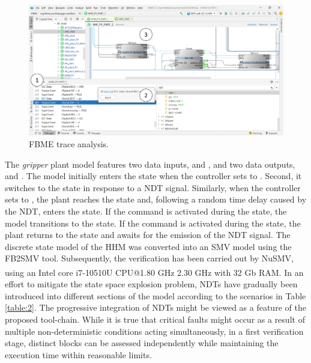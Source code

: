 \documentclass{ieeeojies}
\begin{document}
\begin{figure}
    \centering
    \includegraphics[scale=0.5]{pictures/lilli11.png}
    \caption{FBME trace analysis.} 
    \label{fig:fbme}
\end{figure}

\noindent The \textit{gripper} plant model features two data inputs,  and , and two data outputs,  and . 
The model initially enters the  state when the controller sets  to . Second, it switches to the  state in response to a NDT signal.
Similarly, when the controller sets  to , the plant reaches the  state and, following a random time delay caused by the NDT, enters the  state.
If the  command is activated during the  state, the model transitions to the  state. If the  command is activated during the  state, the plant returns to the  state and awaits for the emission of the NDT signal.
The discrete state model of the HHM was converted into an SMV model using the FB2SMV tool. Subsequently, the verification has been carried out by NuSMV, using an Intel\textsuperscript{\textregistered} core\textsuperscript{\texttrademark} \mbox{i7-10510U} CPU@1.80 GHz 2.30 GHz with 32 Gb RAM. 
In an effort to mitigate the state space explosion problem, NDTs have gradually been introduced into different sections of the model according to the scenarios in Table \ref{table:2}.
The progressive integration of NDTs might be viewed as a feature of the proposed tool-chain.
While it is true that critical faults might occur as a result of multiple non-deterministic conditions acting simultaneously, in a first verification stage, distinct blocks can be assessed independently while maintaining the execution time within reasonable limits. 
\end{document}
